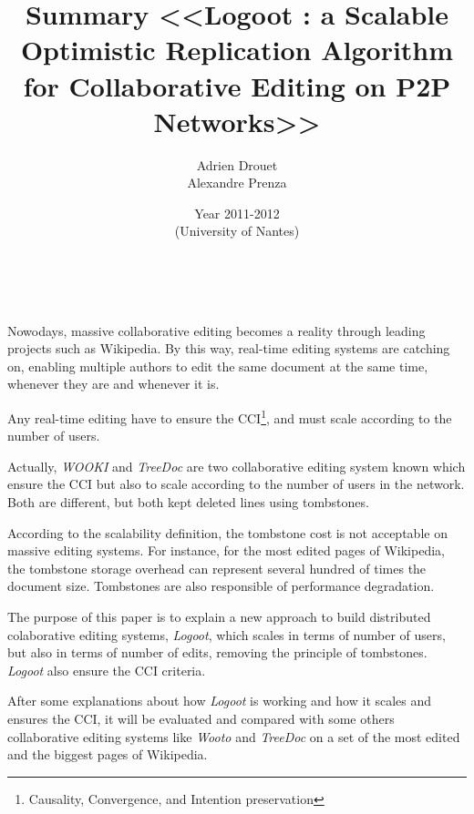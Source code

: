 \documentclass[11pt, a4paper]{article}
\title{ Summary
       <<Logoot : a Scalable Optimistic Replication Algorithm for Collaborative Editing on P2P Networks>>}
\author{Adrien Drouet\\Alexandre Prenza}
\date{Year 2011-2012\\
      (University of Nantes)}
\renewcommand{\headrulewidth}{0pt}
\renewcommand{\footrulewidth}{0pt}
\begin{document}
  \maketitle

  ~\newline
  \renewcommand{\footrulewidth}{0.4pt}
  \pagestyle{fancy}
  \newpage

 Nowodays, massive collaborative editing becomes a reality through leading projects such as Wikipedia. By this way, real-time editing systems are catching on, enabling multiple authors to edit the same document at the same time, whenever they are and whenever it is.
 
 Any real-time editing have to ensure the CCI\footnote{Causality, Convergence, and Intention preservation}, and must scale according to the number of users.
 
 Actually, \emph{WOOKI} and \emph{TreeDoc} are two collaborative editing system known which ensure the CCI but also to scale according to the number of users in the network. Both are different, but both kept deleted lines using tombstones. 
 
 According to the scalability definition, the tombstone cost is not acceptable on massive editing systems. For instance, for the most edited pages of Wikipedia, the tombstone storage overhead can represent several hundred of times the document size. Tombstones are also responsible of performance degradation.
 
 The purpose of this paper is to explain a new approach to build distributed colaborative editing systems, \emph{Logoot}, which scales in terms of number of users, but also in terms of number of edits, removing the principle of tombstones. \emph{Logoot} also ensure the CCI criteria.
 
 After some explanations about how \emph{Logoot} is working and how it scales and ensures the CCI, it will be evaluated and compared with some others collaborative editing systems like \emph{Wooto} and \emph{TreeDoc} on a set of the most edited and the biggest pages of Wikipedia.

\end{document}
